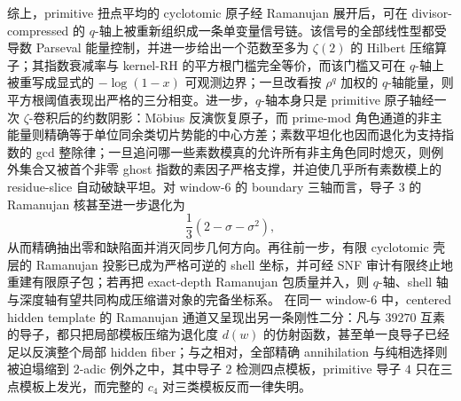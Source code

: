






综上，primitive 扭点平均的 cyclotomic 原子经 Ramanujan 展开后，可在 divisor-compressed 的 \(q\)-轴上被重新组织成一条单变量信号链。该信号的全部线性型都受导数 Parseval 能量控制，并进一步给出一个范数至多为 \(\zeta(2)\) 的 Hilbert 压缩算子；其指数衰减率与 kernel-RH 的平方根门槛完全等价，而该门槛又可在 \(q\)-轴上被重写成显式的 \(-\log(1-x)\) 可观测边界；一旦改看按 \(\rho^q\) 加权的 \(q\)-轴能量，则平方根阈值表现出严格的三分相变。进一步，\(q\)-轴本身只是 primitive 原子轴经一次 \(\zeta\)-卷积后的约数阴影：Möbius 反演恢复原子，而 prime-mod 角色通道的非主能量则精确等于单位同余类切片势能的中心方差；素数平坦化也因而退化为支持指数的 gcd 整除律；一旦追问哪一些素数模真的允许所有非主角色同时熄灭，则例外集合又被首个非零 ghost 指数的素因子严格支撑，并迫使几乎所有素数模上的 residue-slice 自动破缺平坦。对 window-\(6\) 的 boundary 三轴而言，导子 \(3\) 的 Ramanujan 核甚至进一步退化为
\[
\frac13(2-\sigma-\sigma^2),
\]
从而精确抽出零和缺陷面并消灭同步几何方向。再往前一步，有限 cyclotomic 壳层的 Ramanujan 投影已成为严格可逆的 shell 坐标，并可经 SNF 审计有限终止地重建有限原子包；若再把 exact-depth Ramanujan 包质量并入，则 \(q\)-轴、shell 轴与深度轴有望共同构成压缩谱对象的完备坐标系。
在同一 window-\(6\) 中，centered hidden template 的 Ramanujan 通道又呈现出另一条刚性二分：凡与 \(39270\) 互素的导子，都只把局部模板压缩为退化度 \(d(w)\) 的仿射函数，甚至单一良导子已经足以反演整个局部 hidden fiber；与之相对，全部精确 annihilation 与纯相选择则被迫塌缩到 \(2\)-adic 例外之中，其中导子 \(2\) 检测四点模板，primitive 导子 \(4\) 只在三点模板上发光，而完整的 \(c_4\) 对三类模板反而一律失明。

\endinput
